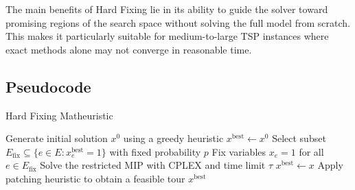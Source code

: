 The main benefits of Hard Fixing lie in its ability to guide the solver toward promising regions of the search space without solving the full model from scratch. This makes it particularly suitable for medium-to-large TSP instances where exact methods alone may not converge in reasonable time.

\subsection{Pseudocode}

\begin{algorithm}[H]
\caption{Hard Fixing Matheuristic}
\begin{algorithmic}[1]
\State Generate initial solution $x^0$ using a greedy heuristic
\State $x^\text{best} \gets x^0$
\Repeat
    \State Select subset $E_\text{fix} \subseteq \{e \in E : x^\text{best}_e = 1\}$ with fixed probability $p$
    \State Fix variables $x_e = 1$ for all $e \in E_\text{fix}$
    \State Solve the restricted MIP with CPLEX and time limit $\tau$
        \State $x^\text{best} \gets x$
        \State Apply patching heuristic to obtain a feasible tour
    \EndIf
{}
\State \Return $x^\text{best}$
\end{algorithmic}
\end{algorithm}
